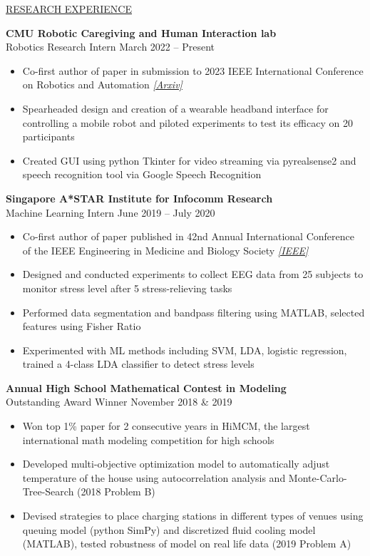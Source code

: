 \documentclass[11pt]{article}
\newcommand{\betteruline}[1]{
    \uline{#1}
}
\newcommand{\sectiontitle}[1]{
    \begingroup
        \titlebold
        \betteruline{\Large\uppercase{#1}  }
        \vspace{1.7mm}
    \endgroup
}
\newcommand{\sectioncontent}[1]{
    \begingroup
        \begin{FlushLeft}
        \vspace{-3mm}
        \sffamily\small#1
        \end{FlushLeft}
    \endgroup
    \vspace{2mm}
}
\newcommand{\job}[3]{
    \begingroup
        \textbf{\normalsize#1} \\
        \small#2 \hfill\color{black!70}\small{#3}
    \endgroup
}
\newcommand{\spacevv}{
    \vspace{2mm}
}
\begin{document}
\begin{paracol}{2}
    \switchcolumn

    \sectiontitle{Research Experience}
    \sectioncontent{

      \job{CMU Robotic Caregiving and Human Interaction lab }{Robotics Research Intern}{March 2022 – Present}
      \begin{itemize}
        \item Co-first author of paper in submission to 2023 IEEE International Conference on Robotics and Automation \href{https://arxiv.org/abs/2209.13097}{\textit{[Arxiv]}} 
        \item Spearheaded design and creation of a wearable headband interface for controlling a mobile robot and piloted experiments to test its efficacy on 20 participants 
        \item Created GUI using python Tkinter for video streaming via pyrealsense2 and speech recognition tool via Google Speech Recognition
      \end{itemize}
      \spacevv

      \job{Singapore A*STAR Institute for Infocomm Research}{Machine Learning Intern}{June 2019 – July 2020}
      \begin{itemize}
        \item Co-first author of paper published in 42nd Annual International Conference of the IEEE Engineering in Medicine and Biology Society \href{https://ieeexplore.ieee.org/document/9175900}{\textit{[IEEE]}}  
        \item Designed and conducted experiments to collect EEG data from 25 subjects to monitor stress level after 5 stress-relieving tasks
        \item Performed data segmentation and bandpass filtering using MATLAB, selected features using Fisher Ratio 
        \item Experimented with ML methods including SVM, LDA, logistic regression, trained a 4-class LDA classifier to detect stress levels
      \end{itemize}
      \spacevv

      \job{Annual High School Mathematical Contest in Modeling}{Outstanding Award Winner}{November 2018 \& 2019} 
    \begin{itemize}
        \item Won top 1\% paper for 2 consecutive years in HiMCM, the largest international math modeling competition for high schools
        \item Developed multi-objective optimization model to automatically adjust temperature of the house using autocorrelation analysis and Monte-Carlo-Tree-Search (2018 Problem B)
        \item Devised strategies to place charging stations in different types of venues using queuing model (python SimPy) and discretized fluid cooling model (MATLAB), tested robustness of model on real life data (2019 Problem A)
    \end{itemize}
    } 



\end{paracol}
\end{document}
